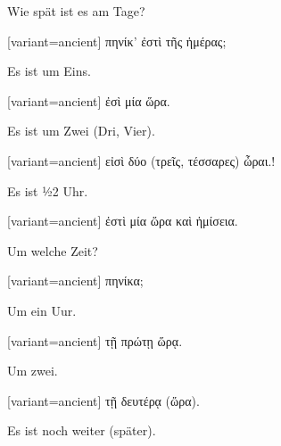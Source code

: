 Wie spät ist es am Tage?

\switchcolumn

\begin{greek}[variant=ancient]%
πηνίκ' ἐστὶ τῆς ἡμέρας;

\end{greek}%
\switchcolumn*

Es ist um Eins.

\switchcolumn

\begin{greek}[variant=ancient]%
ἐσὶ μία ὥρα.

\end{greek}%
\switchcolumn*

Es ist um Zwei (Dri, Vier).

\switchcolumn

\begin{greek}[variant=ancient]%
εἰσὶ δύο (τρεῖς, τέσσαρες) ὦραι.!

\end{greek}%
\switchcolumn*

Es ist ½2 Uhr.

\switchcolumn

\begin{greek}[variant=ancient]%
ἐστὶ μία ὥρα καὶ ἡμίσεια.

\end{greek}%
\switchcolumn*

Um welche Zeit?

\switchcolumn

\begin{greek}[variant=ancient]%
πηνίκα;

\end{greek}%
\switchcolumn*

Um ein Uur.

\switchcolumn

\begin{greek}[variant=ancient]%
τῇ πρώτῃ ὥρᾳ.

\end{greek}%
\switchcolumn*

Um zwei.

\switchcolumn

\begin{greek}[variant=ancient]%
τῇ δευτέρᾳ (ὥρα).

\end{greek}%
\switchcolumn*

Es ist noch weiter (später).

\switchcolumn

